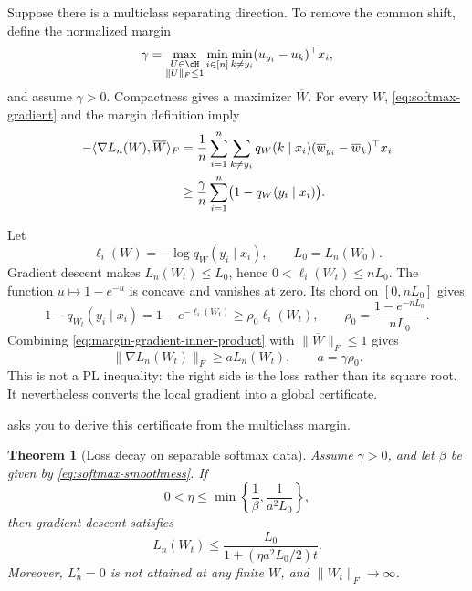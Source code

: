 \documentclass[11pt,twoside]{article}
\newtheorem{theorem}{Theorem}[section]
\theoremstyle{definition}
\theoremstyle{remark}
\begin{document}
Suppose there is a multiclass separating direction. To remove the common
shift, define the normalized margin
\begin{equation}
 \gamma=\max_{\substack{U\in\cH\\\|U\|_F\le1}}
 \min_{i\in[n]}\min_{k\ne y_i}
 (u_{y_i}-u_k)^\top x_i,
 \label{eq:multiclass-margin}
\end{equation}
and assume $\gamma>0$. Compactness gives a maximizer $\overline W$. For
every $W$, \cref{eq:softmax-gradient} and the margin definition imply
\begin{align}
 -\langle\nabla L_n(W),\overline W\rangle_F
 &=\frac1n\sum_{i=1}^n\sum_{k\ne y_i}
 q_W(k\mid x_i)
 (\overline w_{y_i}-\overline w_k)^\top x_i\notag\\
 &\ge\frac\gamma n\sum_{i=1}^n
       \bigl(1-q_W(y_i\mid x_i)\bigr).
 \label{eq:margin-gradient-inner-product}
\end{align}

Let
\[
 \ell_i(W)=-\log q_W(y_i\mid x_i),
 \qquad L_0=L_n(W_0).
\]
Gradient descent makes $L_n(W_t)\le L_0$, hence
$0<\ell_i(W_t)\le nL_0$. The function $u\mapsto1-e^{-u}$ is concave and
vanishes at zero. Its chord on $[0,nL_0]$ gives
\begin{equation}
 1-q_{W_t}(y_i\mid x_i)
 =1-e^{-\ell_i(W_t)}
 \ge\rho_0\ell_i(W_t),
 \qquad
 \rho_0=\frac{1-e^{-nL_0}}{nL_0}.
 \label{eq:probability-loss-comparison}
\end{equation}
Combining \cref{eq:margin-gradient-inner-product} with
$\|\overline W\|_F\le1$ gives
\begin{equation}
 \|\nabla L_n(W_t)\|_F
 \ge aL_n(W_t),
 \qquad a=\gamma\rho_0.
 \label{eq:separable-gradient-certificate}
\end{equation}
This is not a PL inequality: the right side is the loss rather than its
square root. It nevertheless converts the local gradient into a global
certificate.

 asks you to derive this certificate from the
multiclass margin.

\begin{theorem}[Loss decay on separable softmax data]
\label{thm:softmax-separable-rate}
Assume $\gamma>0$, and let $\beta$ be given by
\cref{eq:softmax-smoothness}. If
\begin{equation}
 0<\eta\le
 \min\left\{\frac1\beta,\frac1{a^2L_0}\right\},
 \label{eq:separable-stepsize}
\end{equation}
then gradient descent satisfies
\begin{equation}
 L_n(W_t)
 \le\frac{L_0}{1+(\eta a^2L_0/2)t}.
 \label{eq:separable-rate}
\end{equation}
Moreover, $L_n^\star=0$ is not attained at any finite $W$, and
$\|W_t\|_F\to\infty$.
\end{theorem}
\end{document}
